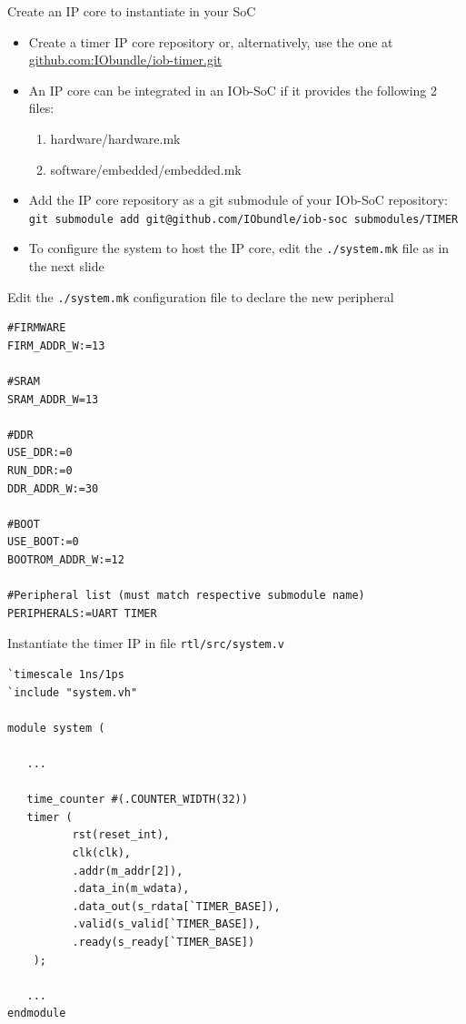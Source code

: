 \documentclass [xcolor=svgnames, t] {beamer}
\begin{document}
\begin{frame}{Create an IP core to instantiate in your SoC}
  \begin{itemize}
  \item Create a timer IP core repository or, alternatively, use the one at \url{github.com:IObundle/iob-timer.git}
  \item An IP core can be integrated in an IOb-SoC if it provides the following 2 files: 
    \begin{enumerate}
    \item hardware/hardware.mk
    \item software/embedded/embedded.mk
    \end{enumerate}
  \item Add the IP core repository as a git submodule of your IOb-SoC repository:\\
    {\tt git submodule add git@github.com/IObundle/iob-soc submodules/TIMER}
  \item To configure the system to host the IP core, edit the {\tt ./system.mk} file as in the next slide
  \end{itemize}
\end{frame}

\begin{frame}[fragile]{Edit the {\tt ./system.mk} configuration file to declare the new peripheral}
\begin{tiny}
\begin{lstlisting}
#FIRMWARE
FIRM_ADDR_W:=13

#SRAM
SRAM_ADDR_W=13

#DDR
USE_DDR:=0
RUN_DDR:=0
DDR_ADDR_W:=30

#BOOT
USE_BOOT:=0
BOOTROM_ADDR_W:=12

#Peripheral list (must match respective submodule name)
PERIPHERALS:=UART TIMER
\end{lstlisting}
\end{tiny}
\end{frame}


\begin{frame}[fragile]{Instantiate the timer IP in file {\tt rtl/src/system.v}}
\begin{tiny}
\begin{lstlisting}
`timescale 1ns/1ps
`include "system.vh"

module system (

   ...

   time_counter #(.COUNTER_WIDTH(32))
   timer (
          rst(reset_int),
          clk(clk),
          .addr(m_addr[2]),
          .data_in(m_wdata),
          .data_out(s_rdata[`TIMER_BASE]),
          .valid(s_valid[`TIMER_BASE]),
          .ready(s_ready[`TIMER_BASE])
    );

   ...
endmodule
\end{lstlisting}
\end{tiny}
\end{frame}
\end{document}
